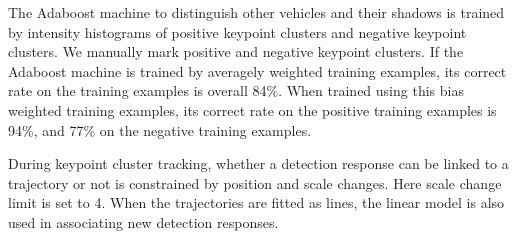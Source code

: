The Adaboost machine to distinguish other vehicles and their shadows is trained by intensity histograms of positive keypoint clusters and negative keypoint clusters. We manually mark  positive  and  negative keypoint clusters. If the Adaboost machine is trained by averagely weighted training examples, its correct rate on the training examples is overall 84\%. When trained using this bias weighted training examples, its correct rate on the positive training examples is 94\%, and 77\% on the negative training examples.

During keypoint cluster tracking, whether a detection response can be linked to a trajectory or not is constrained by position and scale changes. Here scale change limit is set to 4. When the trajectories are fitted as lines, the linear model is also used in associating new detection responses.



